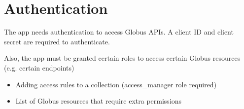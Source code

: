 
\section{Authentication}

The app needs authentication to access Globus APIs. A client ID and client secret are required to
authenticate.

Also, the app must be granted certain roles to access certain Globus resources (e.g. certain endpoints)

\begin{itemize}
    \item Adding access rules to a collection (access\_manager role required)
    \item 
    \caption{List of Globus resources that require extra permissions}
\end{itemize}

\section{}